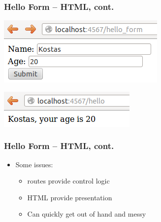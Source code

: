 \documentclass{beamer}
\begin{document}
\begin{frame}[fragile]\frametitle{Hello Form -- HTML, cont.}

  \begin{center}
    \includegraphics[scale=0.5]{images/hello_form.png} 
  \end{center}

  \begin{center}
    \includegraphics[scale=0.6]{images/hello_from_post.png}  
  \end{center}
  
\end{frame}




\begin{frame}[fragile]\frametitle{Hello Form -- HTML, cont.}

  
  
  \begin{itemize}
    \item Some issues:
    \begin{itemize}
      \item routes provide control logic
      \item HTML provide presentation
      \item Can quickly get out of hand and messy
    \end{itemize}
  \end{itemize}

\end{frame}
\end{document}
